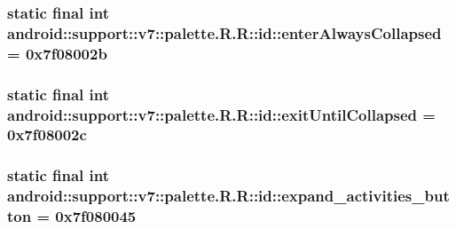 \hypertarget{classandroid_1_1support_1_1v7_1_1palette_1_1_r_1_1id_9aada7d11225956e819e077e5f4b28dc}{
\subsubsection[{enterAlwaysCollapsed}]{\setlength{\rightskip}{0pt plus 5cm}static final int android::support::v7::palette.R.R::id::enterAlwaysCollapsed = 0x7f08002b}}
\label{classandroid_1_1support_1_1v7_1_1palette_1_1_r_1_1id_9aada7d11225956e819e077e5f4b28dc}


\hypertarget{classandroid_1_1support_1_1v7_1_1palette_1_1_r_1_1id_6f6f4bfd393a27c02ec32f9d0fea1813}{
\subsubsection[{exitUntilCollapsed}]{\setlength{\rightskip}{0pt plus 5cm}static final int android::support::v7::palette.R.R::id::exitUntilCollapsed = 0x7f08002c}}
\label{classandroid_1_1support_1_1v7_1_1palette_1_1_r_1_1id_6f6f4bfd393a27c02ec32f9d0fea1813}


\hypertarget{classandroid_1_1support_1_1v7_1_1palette_1_1_r_1_1id_85ebb77ccbf764e6109582fabeb390f4}{
\subsubsection[{expand\_\-activities\_\-button}]{\setlength{\rightskip}{0pt plus 5cm}static final int android::support::v7::palette.R.R::id::expand\_\-activities\_\-button = 0x7f080045}}
\label{classandroid_1_1support_1_1v7_1_1palette_1_1_r_1_1id_85ebb77ccbf764e6109582fabeb390f4}


